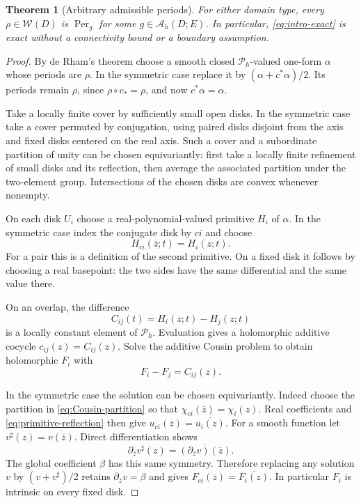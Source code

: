 \documentclass[11pt,a4paper]{article}
\numberwithin{equation}{section}
\newtheorem{theorem}{Theorem}[section]
\theoremstyle{definition}
\theoremstyle{remark}
\newcommand{\A}{\mathcal A_h}
\newcommand{\Pspace}{\mathscr P_h}
\newcommand{\Per}{\operatorname{Per}}
\newcommand{\calW}{\mathscr W}
\newcommand{\barz}{\overline z}
\newcommand{\dbar}{\partial_{\bar z}}
\begin{document}
\begin{theorem}[Arbitrary admissible periods]\label{thm:surjectivity}
For either domain type, every $\rho\in\calW(D)$ is $\Per_g$ for some
$g\in\A(D;E)$. In particular, \eqref{eq:intro-exact} is exact without a
connectivity bound or a boundary assumption.
\end{theorem}
\begin{proof}
By de Rham's theorem choose a smooth closed $\Pspace$-valued one-form $\alpha$
whose periods are $\rho$. In the symmetric case replace it by
$(\alpha+c^*\alpha)/2$. Its periods remain $\rho$, since
$\rho\circ c_*=\rho$, and now $c^*\alpha=\alpha$.

Take a locally finite cover by sufficiently small open disks. In the symmetric
case take a cover permuted by conjugation, using paired disks disjoint from the
axis and fixed disks centered on the real axis. Such a cover and a subordinate
partition of unity can be chosen equivariantly: first take a locally finite
refinement of small disks and its reflection, then average the associated
partition under the two-element group. Intersections of the chosen disks are
convex whenever nonempty.

On each disk $U_i$ choose a real-polynomial-valued primitive $H_i$ of
$\alpha$. In the symmetric case index the conjugate disk by $ci$ and choose
\begin{equation}\label{eq:primitive-reflection}
 H_{ci}(\barz;t)=H_i(z;t).
\end{equation}
For a pair this is a definition of the second primitive. On a fixed disk it
follows by choosing a real basepoint: the two sides have the same differential
and the same value there.

On an overlap, the difference
\[
 C_{ij}(t)=H_i(z;t)-H_j(z;t)
\]
is a locally constant element of $\Pspace$. Evaluation gives a holomorphic
additive cocycle $c_{ij}(z)=C_{ij}(z)$. Solve the additive Cousin problem to
obtain holomorphic $F_i$ with
\begin{equation}\label{eq:cocycle-F}
 F_i-F_j=C_{ij}(z).
\end{equation}

In the symmetric case the solution can be chosen equivariantly. Indeed choose
the partition in \eqref{eq:Cousin-partition} so that
$\chi_{ci}(\barz)=\chi_i(z)$. Real coefficients and
\eqref{eq:primitive-reflection} then give
$u_{ci}(\barz)=\overline{u_i(z)}$. For a smooth function let
$v^\sharp(z)=\overline{v(\barz)}$. Direct differentiation shows
\[
 \dbar v^\sharp(z)=\overline{(\dbar v)(\barz)}.
\]
The global coefficient $\beta$ has this same symmetry. Therefore replacing
any solution $v$ by $(v+v^\sharp)/2$ retains $\dbar v=\beta$ and gives
$F_{ci}(\barz)=\overline{F_i(z)}$. In particular $F_i$ is intrinsic on every
fixed disk.


\end{proof}
\end{document}
